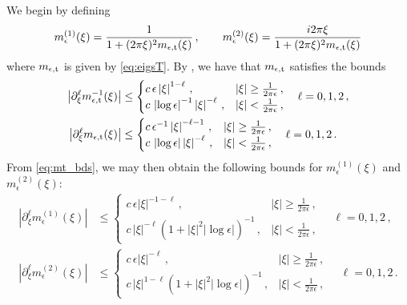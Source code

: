 \documentclass[11pt,reqno]{amsart}
\newcommand{\p}{\partial}
\newcommand{\abs}[1]{\left\lvert #1 \right\rvert}
\theoremstyle{definition}
\begin{document}
We begin by defining
\begin{equation}
  m^{(1)}_\epsilon(\xi) = \frac{1}{1+(2\pi\xi)^2m_{\epsilon,\rm t}(\xi)}\,, \qquad
  m^{(2)}_\epsilon(\xi) = \frac{i2\pi\xi}{1+(2\pi\xi)^2m_{\epsilon,\rm t}(\xi)}
\end{equation}
where $m_{\epsilon,\rm t}$ is given by \eqref{eq:eigsT}.
%
By \cite[Lemma 3.4]{ohm2024free}, we have that $m_{\rm \epsilon,t}$ satisfies the bounds  
\begin{equation}\label{eq:mt_bds}
\begin{aligned}
\abs{\p_{\xi}^\ell m_{\epsilon,{\rm t}}^{-1}(\xi)} &\le 
\begin{cases}
c\,\epsilon\abs{\xi}^{1-\ell}\, , & \abs{\xi}\ge\frac{1}{2\pi\epsilon} \,, \\
%
c\,\abs{\log\epsilon}^{-1}\abs{\xi}^{-\ell}\,, & \abs{\xi}<\frac{1}{2\pi\epsilon} \,,
\end{cases} 
\quad \ell=0,1,2\,,\\
%  
\abs{\p_{\xi}^\ell m_{\epsilon,{\rm t}}(\xi)} &\le 
\begin{cases}
c\,\epsilon^{-1} \abs{\xi}^{-\ell-1}\,, & \abs{\xi}\ge\frac{1}{2\pi\epsilon} \,, \\
%
c\,\abs{\log\epsilon}\abs{\xi}^{-\ell} \,, & \abs{\xi}<\frac{1}{2\pi\epsilon}\,,
\end{cases}
\quad \ell=0,1,2\,.
\end{aligned}
\end{equation}
From \eqref{eq:mt_bds}, we may then obtain the following bounds for $m^{(1)}_\epsilon(\xi)$ and $m^{(2)}_\epsilon(\xi)$: 
\begin{equation}\label{eq:meps_bds}
\begin{aligned}
\abs{\p_{\xi}^\ell m_\epsilon^{(1)}(\xi)} &\le 
\begin{cases}
c\,\epsilon\abs{\xi}^{-1-\ell}\, , & \abs{\xi}\ge\frac{1}{2\pi\epsilon} \,, \\
%
c\,\abs{\xi}^{-\ell}(1+\abs{\xi}^2\abs{\log\epsilon})^{-1}\,, & \abs{\xi}<\frac{1}{2\pi\epsilon} \,,
\end{cases} 
\quad \ell=0,1,2\,,\\
%  
\abs{\p_{\xi}^\ell m_\epsilon^{(2)}(\xi)} &\le 
\begin{cases}
c\,\epsilon\abs{\xi}^{-\ell}\,, & \abs{\xi}\ge\frac{1}{2\pi\epsilon} \,, \\
%
c\,\abs{\xi}^{1-\ell}(1+\abs{\xi}^2\abs{\log\epsilon})^{-1} \,, & \abs{\xi}<\frac{1}{2\pi\epsilon}\,,
\end{cases}
\quad \ell=0,1,2\,.
\end{aligned}
\end{equation}
\end{document}
